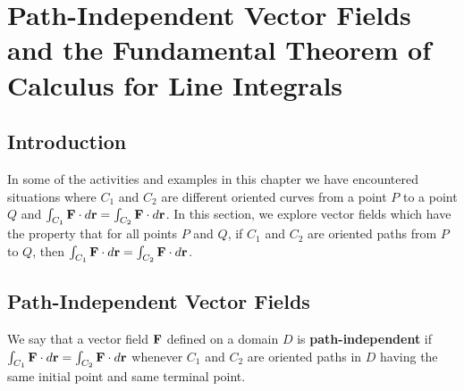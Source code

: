 \section[Path-Independent Vector Fields]{Path-Independent Vector Fields and the Fundamental Theorem of
Calculus for Line Integrals} \label{S:12.4.FTCLI}


\vspace*{-14 pt}

\subsection*{Introduction}

In some of the activities and examples in this chapter we have
encountered situations where $C_1$ and $C_2$ are different oriented curves from a
point $P$ to a point $Q$ and $\int_{C_1}\mathbf{F}\cdot d\mathbf{r} =
\int_{C_2}\mathbf{F}\cdot d\mathbf{r}$. In this section, we explore vector fields
which have the property that for all points $P$ and $Q$, if $C_1$ and
$C_2$ are oriented paths from $P$ to $Q$, then $\int_{C_1}\mathbf{F}\cdot
d\mathbf{r} = \int_{C_2}\mathbf{F}\cdot d\mathbf{r}$.



\subsection*{Path-Independent Vector Fields}

We say that a vector field $\mathbf{F}$ defined on a domain $D$ is
\textbf{path-independent}  if
$\int_{C_1}\mathbf{F}\cdot d\mathbf{r} = \int_{C_2}\mathbf{F}\cdot d\mathbf{r}$ whenever $C_1$ and
$C_2$ are oriented paths in $D$ having the same initial point and same
terminal point. 

